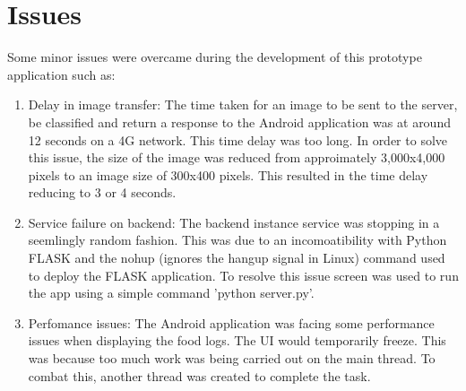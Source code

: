 \section{Issues}
Some minor issues were overcame during the development of this prototype application such as:
\begin{enumerate}
	\item{Delay in image transfer: The time taken for an image to be sent to the server, be classified and return a response to the Android application was at around 12 seconds on a 4G network. This time delay was too long. In order to solve this issue, the size of the image was reduced from approimately 3,000x4,000 pixels to an image size of 300x400 pixels. This resulted in the time delay reducing to 3 or 4 seconds.}
	\item{Service failure on backend: The backend instance service was stopping in a seemlingly random fashion. This was due to an incomoatibility with Python FLASK and the nohup (ignores the hangup signal in Linux) command used to deploy the FLASK application. To resolve this issue screen was used to run the app using a simple command 'python server.py'.}
	\item{Perfomance issues: The Android application was facing some performance issues when displaying the food logs. The UI would temporarily freeze. This was because too much work was being carried out on the main thread. To combat this, another thread was created to complete the task.}
\end{enumerate}